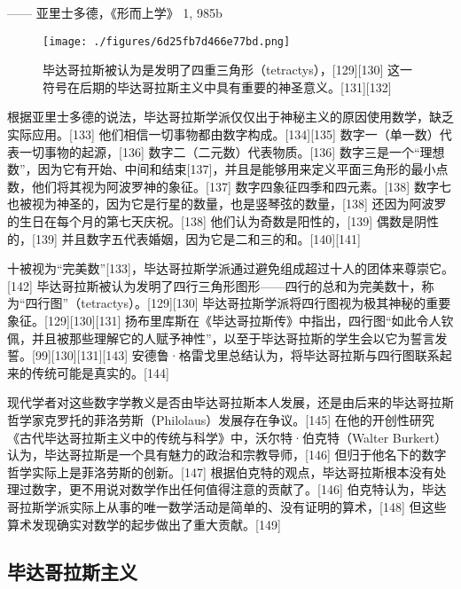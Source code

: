 —— 亚里士多德，《形而上学》 1, 985b
\begin{figure}[ht]
\centering
\texttt{[image: ./figures/6d25fb7d466e77bd.png]}
\caption{毕达哥拉斯被认为是发明了四重三角形（tetractys），[129][130] 这一符号在后期的毕达哥拉斯主义中具有重要的神圣意义。[131][132]} \label{fig_Pythag_8}
\end{figure}
根据亚里士多德的说法，毕达哥拉斯学派仅仅出于神秘主义的原因使用数学，缺乏实际应用。[133] 他们相信一切事物都由数字构成。[134][135] 数字一（单一数）代表一切事物的起源，[136] 数字二（二元数）代表物质。[136] 数字三是一个“理想数”，因为它有开始、中间和结束[137]，并且是能够用来定义平面三角形的最小点数，他们将其视为阿波罗神的象征。[137] 数字四象征四季和四元素。[138] 数字七也被视为神圣的，因为它是行星的数量，也是竖琴弦的数量，[138] 还因为阿波罗的生日在每个月的第七天庆祝。[138] 他们认为奇数是阳性的，[139] 偶数是阴性的，[139] 并且数字五代表婚姻，因为它是二和三的和。[140][141]

十被视为“完美数”[133]，毕达哥拉斯学派通过避免组成超过十人的团体来尊崇它。[142] 毕达哥拉斯被认为发明了四行三角形图形——四行的总和为完美数十，称为“四行图”（tetractys）。[129][130] 毕达哥拉斯学派将四行图视为极其神秘的重要象征。[129][130][131] 扬布里库斯在《毕达哥拉斯传》中指出，四行图“如此令人钦佩，并且被那些理解它的人赋予神性”，以至于毕达哥拉斯的学生会以它为誓言发誓。[99][130][131][143] 安德鲁·格雷戈里总结认为，将毕达哥拉斯与四行图联系起来的传统可能是真实的。[144]

现代学者对这些数字学教义是否由毕达哥拉斯本人发展，还是由后来的毕达哥拉斯哲学家克罗托的菲洛劳斯（Philolaus）发展存在争议。[145] 在他的开创性研究《古代毕达哥拉斯主义中的传统与科学》中，沃尔特·伯克特（Walter Burkert）认为，毕达哥拉斯是一个具有魅力的政治和宗教导师，[146] 但归于他名下的数字哲学实际上是菲洛劳斯的创新。[147] 根据伯克特的观点，毕达哥拉斯根本没有处理过数字，更不用说对数学作出任何值得注意的贡献了。[146] 伯克特认为，毕达哥拉斯学派实际上从事的唯一数学活动是简单的、没有证明的算术，[148] 但这些算术发现确实对数学的起步做出了重大贡献。[149]
\subsection{毕达哥拉斯主义}  
